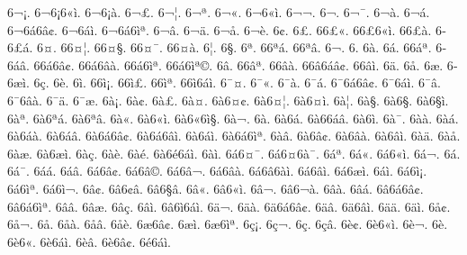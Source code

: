 {6^^ac^^a1. 6^^ac6^^a16^^ab^^ec. 6^^ac6^^a1^^e0. 6^^ac^^a3. 6^^ac^^a6. 6^^ac^^aa. 6^^ac^^ab. 6^^ac6^^ab^^ec. 
6^^ac^^ac. 6^^ac^^ad. 6^^ac^^af. 6^^ac^^e0. 6^^ac^^e1. 6^^ac6^^e16^^e2^^a2. 6^^ac6^^e1^^ec. 6^^ac6^^e16^^ec^^aa. 
6^^ac^^e2. 6^^ac^^e4. 6^^ac^^e5. 6^^ac^^e8. 6^^ad^^a2. 6^^ad^^a3. 6^^ad6^^a3^^ab. 6^^ad6^^a36^^ab^^ec. 
6^^ad6^^a3^^e0. 6^^ad6^^a3^^e1. 6^^ad^^a4. 6^^ad6^^a4^^a6. 6^^ad6^^a4^^a7. 6^^ad6^^a4^^af. 6^^ad6^^a4^^e0. 6^^ad^^a6. 
6^^ad^^a7. 6^^ad^^aa. 6^^ad6^^aa^^e1. 6^^ad6^^aa^^e2. 6^^ad^^ac. 6^^ad^^ad. 6^^ad^^e0. 6^^ad^^e1. 
6^^ad6^^e1^^aa. 6^^ad6^^e1^^e2. 6^^ad6^^e16^^e2^^a2. 6^^ad6^^e16^^e2^^e0. 6^^ad6^^e16^^ec^^aa. 6^^ad6^^e16^^ec^^aa^^a9. 6^^ad^^e2. 6^^ad6^^e2^^aa. 
6^^ad6^^e2^^e0. 6^^ad6^^e26^^e1^^e2^^a2. 6^^ad6^^e2^^ec. 6^^ad^^e4. 6^^ad^^e5. 6^^ad^^e6. 6^^ad6^^e6^^ec. 6^^ad^^e7. 
6^^ad^^e8. 6^^ad^^ec. 6^^ad6^^ec^^a1. 6^^ad6^^ec^^a3. 6^^ad6^^ec^^aa. 6^^ad6^^ec6^^e1^^ec. 6^^af^^a4. 6^^af^^ab. 
6^^af^^e0. 6^^af^^e1. 6^^af6^^e16^^e2^^a2. 6^^af6^^e1^^ec. 6^^af^^e2. 6^^af6^^e2^^e0. 6^^af^^e4. 6^^af^^e6. 
6^^e0^^a1. 6^^e0^^a2. 6^^e0^^a3. 6^^e0^^a4. 6^^e06^^a4^^a2. 6^^e06^^a4^^a6. 6^^e06^^a4^^ec. 6^^e0^^a6. 
6^^e0^^a7. 6^^e06^^a7^^ad. 6^^e06^^a7^^ec. 6^^e0^^aa. 6^^e06^^aa^^e1. 6^^e06^^aa^^e2. 6^^e0^^ab. 6^^e06^^ab^^ec. 
6^^e06^^ab6^^ec^^a7. 6^^e0^^ac. 6^^e0^^ad. 6^^e06^^ad^^e1. 6^^e06^^ad6^^e1^^e2. 6^^e06^^ad^^ec. 6^^e0^^af. 6^^e0^^e0. 
6^^e0^^e1. 6^^e06^^e1^^e0. 6^^e06^^e1^^e2. 6^^e06^^e16^^e2^^a2. 6^^e06^^e16^^e2^^ec. 6^^e06^^e1^^ec. 6^^e06^^e16^^ec^^aa. 6^^e0^^e2. 
6^^e06^^e2^^a2. 6^^e06^^e2^^e0. 6^^e06^^e2^^ec. 6^^e0^^e4. 6^^e0^^e5. 6^^e0^^e6. 6^^e06^^e6^^ec. 6^^e0^^e7. 
6^^e0^^e8. 6^^e0^^e9. 6^^e06^^e96^^e1^^ec. 6^^e0^^ec. 6^^e16^^a4^^af. 6^^e16^^a46^^e0^^af. 6^^e1^^aa. 6^^e1^^ab. 
6^^e16^^ab^^ec. 6^^e1^^ac. 6^^e1^^ad. 6^^e1^^af. 6^^e1^^e1. 6^^e1^^e2. 6^^e16^^e2^^a2. 6^^e16^^e2^^a9. 
6^^e16^^e2^^ac. 6^^e16^^e2^^e0. 6^^e16^^e26^^e0^^ec. 6^^e16^^e2^^ec. 6^^e16^^e6^^ec. 6^^e1^^ec. 6^^e16^^ec^^a1. 6^^e16^^ec^^aa. 
6^^e16^^ec^^ac. 6^^e2^^a2. 6^^e26^^a2^^e2. 6^^e26^^a7^^e2. 6^^e2^^ab. 6^^e26^^ab^^ec. 6^^e2^^ac. 6^^e26^^ac^^e0. 
6^^e2^^e0. 6^^e2^^e1. 6^^e26^^e16^^e2^^a2. 6^^e26^^e16^^ec^^aa. 6^^e2^^e2. 6^^e2^^e6. 6^^e2^^e7. 6^^e2^^ec. 
6^^e26^^ec6^^e1^^ec. 6^^e4^^ac. 6^^e4^^e0. 6^^e46^^e16^^e2^^a2. 6^^e4^^e2. 6^^e46^^e2^^ec. 6^^e4^^e4. 6^^e4^^ec. 
6^^e5^^a2. 6^^e5^^ac. 6^^e5^^ad. 6^^e5^^e0. 6^^e5^^e2. 6^^e5^^e8. 6^^e66^^e2^^a2. 6^^e6^^ec. 
6^^e66^^ec^^aa. 6^^e7^^a1. 6^^e7^^ac. 6^^e7^^ad. 6^^e7^^e2. 6^^e8^^a2. 6^^e86^^ab^^ec. 6^^e8^^ac. 
6^^e8^^ad. 6^^e86^^ad^^ab. 6^^e86^^e1^^ec. 6^^e8^^e2. 6^^e86^^e2^^a2. 6^^e96^^e1^^ec. 
}
